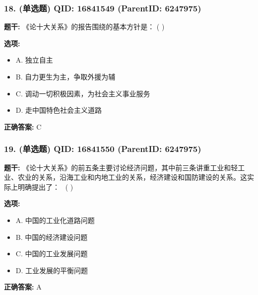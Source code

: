 \documentclass[12pt,UTF8]{ctexart}
\begin{document}
\subsubsection*{18. (单选题) \small QID: 16841549 (ParentID: 6247975)}

\textbf{题干:}
《论十大关系》的报告围绕的基本方针是： ( )



\textbf{选项:}
\begin{itemize}[leftmargin=*]

  \item A. 独立自主

  \item B. 自力更生为主，争取外援为辅

  \item C. 调动一切积极因素，为社会主义事业服务

  \item D. 走中国特色社会主义道路

\end{itemize}

\textbf{正确答案:}
C

\vspace{0.3em}\hrulefill\vspace{0.7em}

\subsubsection*{19. (单选题) \small QID: 16841550 (ParentID: 6247975)}

\textbf{题干:}
《论十大关系》的前五条主要讨论经济问题，其中前三条讲重工业和轻工业、农业的关系，沿海工业和内地工业的关系，经济建设和国防建设的关系。这实际上明确提出了：  ( )



\textbf{选项:}
\begin{itemize}[leftmargin=*]

  \item A. 中国的工业化道路问题

  \item B. 中国的经济建设问题

  \item C. 中国的工业发展问题

  \item D. 工业发展的平衡问题

\end{itemize}

\textbf{正确答案:}
A

\vspace{0.3em}\hrulefill\vspace{0.7em}
\end{document}
